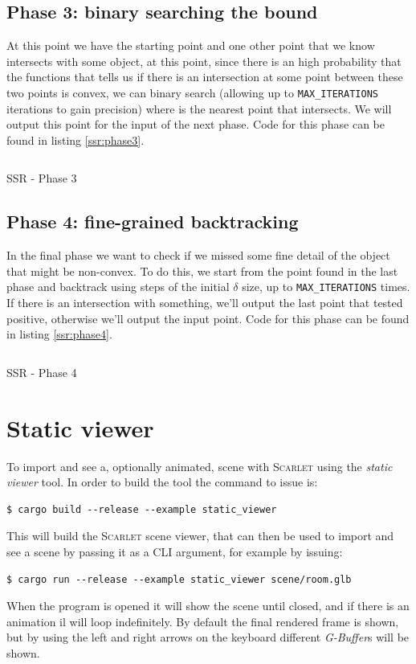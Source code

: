 \documentclass[11pt,a4paper]{report}
\begin{document}
\subsection{Phase 3: binary searching the bound}
At this point we have the starting point and one other point that we know intersects with some object, at this point, since there is an high probability that the functions that tells us if there is an intersection at some point between these two points is convex, we can binary search (allowing up to \texttt{MAX\_ITERATIONS} iterations to gain precision) where is the nearest point that intersects. We will output this point for the input of the next phase. Code for this phase can be found in listing \ref{ssr:phase3}.

\begin{listing}
	\inputminted[tabsize=2, frame=lines,
framesep=2mm,
baselinestretch=1.2,
bgcolor=LightGray,
fontsize=\footnotesize,
linenos]{glsl}{code/phase3.frag}
	\caption{SSR - Phase 3}
	\label{ssr:phase3}
\end{listing}

\subsection{Phase 4: fine-grained backtracking}
In the final phase we want to check if we missed some fine detail of the object that might be non-convex. To do this, we start from the point found in the last phase and backtrack using steps of the initial $\delta$ size, up to \texttt{MAX\_ITERATIONS} times. If there is an intersection with something, we'll output the last point that tested positive, otherwise we'll output the input point. Code for this phase can be found in listing \ref{ssr:phase4}.

\begin{listing}
	\inputminted[tabsize=2, frame=lines,
framesep=2mm,
baselinestretch=1.2,
bgcolor=LightGray,
fontsize=\footnotesize,
linenos]{glsl}{code/phase4.frag}
	\caption{SSR - Phase 4}
	\label{ssr:phase4}
\end{listing}

\section{Static viewer}
To import and see a, optionally animated, scene with \textsc{Scarlet} using the \textit{static viewer} tool. In order to build the tool the command to issue is:
\begin{verbatim}
$ cargo build --release --example static_viewer
\end{verbatim}
This will build the \textsc{Scarlet} scene viewer, that can then be used to import and see a scene by passing it as a CLI argument, for example by issuing:
\begin{verbatim}
$ cargo run --release --example static_viewer scene/room.glb
\end{verbatim}
When the program is opened it will show the scene until closed, and if there is an animation il will loop indefinitely. By default the final rendered frame is shown, but by using the left and right arrows on the keyboard different \textit{G-Buffer}s will be shown.
\end{document}
